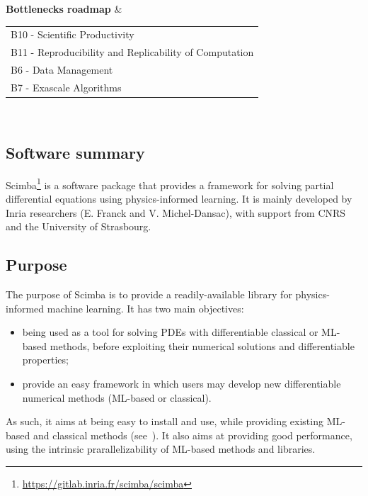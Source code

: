 \begin{FicheMetadataTable}
                \textbf{Bottlenecks roadmap}
                 & \begin{tabular}[t]{@{}p{\linewidth}@{}}
                       B10 - Scientific Productivity                          \\
                       B11 - Reproducibility and Replicability of Computation \\
                       B6 - Data Management                                   \\
                       B7 - Exascale Algorithms                               \\
                   \end{tabular}                              \\
\end{FicheMetadataTable}

\subsection{Software summary}
\label{sec:Scimba:summary}

Scimba\footnote{\url{https://gitlab.inria.fr/scimba/scimba}} is a software package that provides a framework for solving partial differential equations using physics-informed learning. It is mainly developed by Inria researchers (E. Franck and V. Michel-Dansac), with support from CNRS and the University of Strasbourg.

\subsection{Purpose}
\label{sec:Scimba:purpose}

The purpose of Scimba is to provide a readily-available
library for physics-informed machine learning.
It has two main objectives:
\begin{itemize}
    \item being used as a tool for solving PDEs
          with differentiable classical or ML-based methods,
          before exploiting their numerical solutions
          and differentiable properties;
    \item provide an easy framework in which users
          may develop new differentiable numerical methods
          (ML-based or classical).
\end{itemize}
As such, it aims at being easy to install and use,
while providing existing ML-based and classical methods
(see~).
It also aims at providing good performance,
using the intrinsic prarallelizability of
ML-based methods and libraries.

